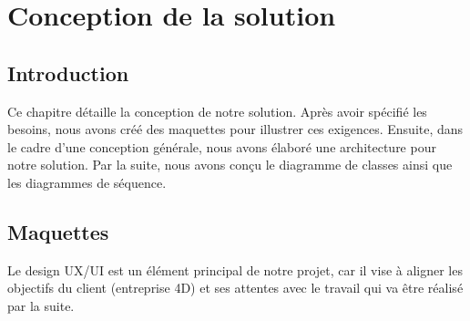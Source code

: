 

\chapter{Conception de la solution}
\pagestyle{chapterstyle}

\newpage
\vspace{1cm}

\section{Introduction}

Ce chapitre détaille la conception de notre solution. Après avoir spécifié 
les besoins, nous avons créé des maquettes pour illustrer 
ces exigences. Ensuite, dans le cadre d'une conception générale, nous avons 
élaboré une architecture pour notre solution. Par la suite, nous avons 
conçu le diagramme de classes ainsi que les diagrammes de séquence.


\section{Maquettes}
Le design UX/UI est un élément principal de notre projet, 
car il vise à aligner les objectifs du client (entreprise 4D) et ses attentes avec 
le travail qui va être réalisé par la suite.
\newline

